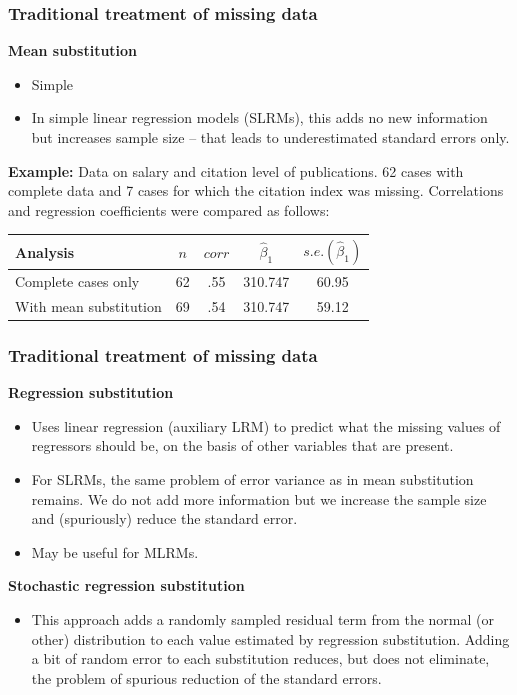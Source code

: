 \documentclass{beamer}
\begin{document}
\begin{frame}
\frametitle{Traditional treatment of missing data}


\textbf{Mean substitution}
\vspace{0.2cm}
  \begin{itemize}
  \item[\ding{51}] Simple
  \item[\ding{55}] In simple linear regression models (SLRMs), this adds no new information but increases sample size – that leads to underestimated standard errors only.
  \end{itemize} 
  \vspace{0.2cm}
\textbf{Example:} Data on salary and citation level of publications. 62 cases with complete data and 7 cases for which the citation index was missing. Correlations and regression coefficients were compared as follows:

\begin{table}
\begin{tabular}{l c c c c}
\toprule
Analysis & $n$ & $corr$ & $\widehat{\beta}_1$ & $\textit{s.e.}(\widehat{\beta}_1)$\\
\midrule
Complete cases only & 62 & .55 &  310.747 & 60.95 \\
With mean substitution & 69 & .54 &  310.747 & 59.12 \\
\bottomrule
\end{tabular}

\end{table}

\end{frame}


\begin{frame}
\frametitle{Traditional treatment of missing data}

\textbf{Regression substitution}
  \begin{itemize}
  \item Uses linear regression (auxiliary LRM) to predict what the missing values of regressors should be, on the basis of other variables that are present.
  \item For SLRMs, the same problem of error variance as in mean substitution remains. We do not add more information but we increase the sample size and (spuriously) reduce the standard error.
  \item May be useful for MLRMs.
   \end{itemize}
  \vspace{0.2cm}
\textbf{Stochastic regression substitution}
  \begin{itemize}
  \item This approach adds a randomly sampled residual term from the normal (or other) distribution to each value estimated by regression substitution. Adding a bit of random error to each substitution reduces, but does not eliminate, the problem of spurious reduction of the standard errors.
   \end{itemize}

\end{frame}
\end{document}

